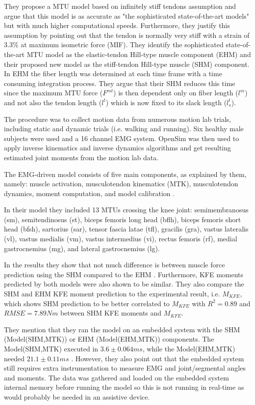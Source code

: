 They propose a MTU model based on infinitely stiff tendons assumption and argue that this model is as accurate as "the sophisticated state-of-the-art models" \cite[p. 2]{Sartori2012} but with much higher computational speeds. Furthermore, they justify this assumption by pointing out that the tendon is normally very stiff with a strain of $3.3\%$ at maximum isometric force (MIF). They identify the sophisticated state-of-the-art MTU model as the elastic-tendon Hill-type muscle component (EHM) and their proposed new model as the stiff-tendon Hill-type muscle (SHM) component. In EHM the fiber length was determined at each time frame with a time consuming integration process. They argue that their SHM reduces this time since the maximum MTU force ($F^{mt}$) is then dependent only on fiber length ($l^m$) and not also the tendon length ($l^t$) which is now fixed to its slack length ($l^t_s$).

The procedure was to collect motion data from numerous motion lab trials, including static and dynamic trials (i.e. walking and running).
Six healthy male subjects were used and a 16 channel \ac{EMG} system.
OpenSim was then used to apply inverse kinematics and inverse dynamics algorithms and get resulting estimated joint moments from the motion lab data.

The \ac{EMG}-driven model consists of five main components, as explained by them, namely: muscle activation, musculotendon kinematics (MTK), musculotendon dynamics, moment computation, and model calibration \cite[p. 4]{Sartori2012}.

In their model they included 13 MTUs crossing the knee joint: semimembranosus (sm), semitendinosus (st), biceps femoris long head (bflh), biceps femoris short head (bfsh), sartorius (sar), tensor fascia latae (tfl), gracilis (gra), vastus lateralis (vl), vastus medialis (vm), vastus intermedius (vi), rectus femoris (rf), medial gastrocnemius (mg), and lateral gastrocnemius (lg).

In the results they show that not much difference is between muscle force prediction using the SHM compared to the EHM \cite[Fig. 3]{Sartori2012}. Furthermore, KFE moments predicted by both models were also shown to be similar. They also compare the SHM and EHM KFE moment prediction to the experimental result, i.e. $M_{KFE}$, which shows SHM prediction to be better correlated to $M_{KFE}$ \cite[Fig. 4]{Sartori2012} with $R^2 = 0.89$ and $RMSE = 7.89Nm$ between SHM KFE moments and $M_{KFE}$.

They mention that they ran the model on an embedded system with the SHM (Model(SHM,MTK)) or EHM (Model(EHM,MTK)) components. 
The Model(SHM,MTK) executed in $3.6 \pm 0.064 ms$, while the Model(EHM,MTK) needed $21.1 \pm 0.11 ms$ \cite[p. 8]{Sartori2012}.
However, they also point out that the embedded system still requires extra instrumentation to measure \ac{EMG} and joint/segmental angles and moments. The data was gathered and loaded on the embedded system internal memory before running the model so this is not running in real-time as would probably be needed in an assistive device.

